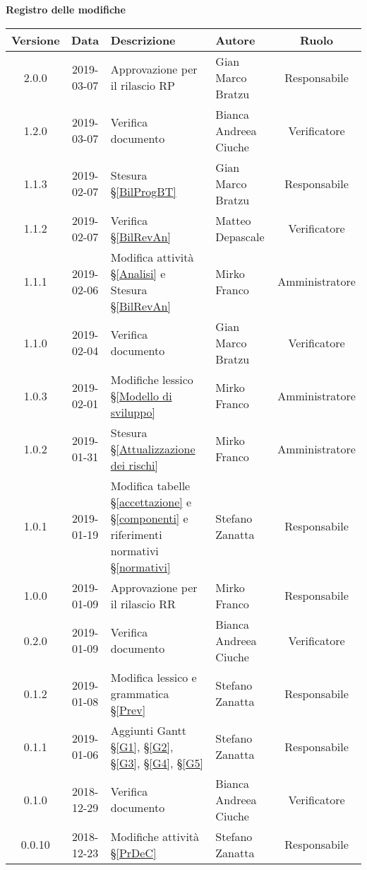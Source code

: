 	\begin{center}
		\textbf{Registro delle modifiche}
	\end{center}
	\begin{center}
		\begin{tabularx}{\textwidth}{|c|c|X|X|c|}
			\hline
			\textbf{Versione} & \textbf{Data} & \textbf{Descrizione} & \textbf{Autore} & \textbf{Ruolo} \\
			\hline
			2.0.0 & 2019-03-07 & Approvazione per il rilascio RP & Gian Marco Bratzu & Responsabile \\			
			\hline
			1.2.0 & 2019-03-07 & Verifica documento & Bianca Andreea Ciuche & Verificatore \\			
			\hline
			1.1.3 & 2019-02-07 & Stesura \S\ref{BilProgBT} & Gian Marco Bratzu & Responsabile \\			
			\hline
			1.1.2 & 2019-02-07 & Verifica \S\ref{BilRevAn} & Matteo Depascale & Verificatore \\
			\hline
			1.1.1 & 2019-02-06 & Modifica attività \S\ref{Analisi} e Stesura \S\ref{BilRevAn} & Mirko Franco & Amministratore \\
			\hline
			1.1.0 & 2019-02-04 & Verifica documento & Gian Marco Bratzu & Verificatore\\
			\hline
			1.0.3 & 2019-02-01 & Modifiche lessico \S\ref{Modello di sviluppo} & Mirko Franco & Amministratore \\
			\hline
			1.0.2 & 2019-01-31 & Stesura \S\ref{Attualizzazione dei rischi} & Mirko Franco & Amministratore \\
			\hline
			1.0.1 & 2019-01-19 & Modifica tabelle \S\ref{accettazione} e \S\ref{componenti} e riferimenti normativi \S\ref{normativi} & Stefano Zanatta & Responsabile\\
			\hline
			1.0.0 & 2019-01-09 & Approvazione per il rilascio RR & Mirko Franco & Responsabile\\
			\hline
			0.2.0 & 2019-01-09 & Verifica documento & Bianca Andreea Ciuche& Verificatore\\
			\hline
			0.1.2 & 2019-01-08 & Modifica lessico e grammatica \S\ref{Prev}& Stefano Zanatta & Responsabile\\
			\hline
			0.1.1 & 2019-01-06 & Aggiunti Gantt \S\ref{G1}, \S\ref{G2}, \S\ref{G3}, \S\ref{G4}, \S\ref{G5} & Stefano Zanatta & Responsabile\\
			\hline
			0.1.0 & 2018-12-29 & Verifica documento & Bianca Andreea Ciuche& Verificatore\\
			\hline
			0.0.10 & 2018-12-23 & Modifiche attività \S\ref{PrDeC} & Stefano Zanatta & Responsabile\\

\end{tabularx}
\end{center}
